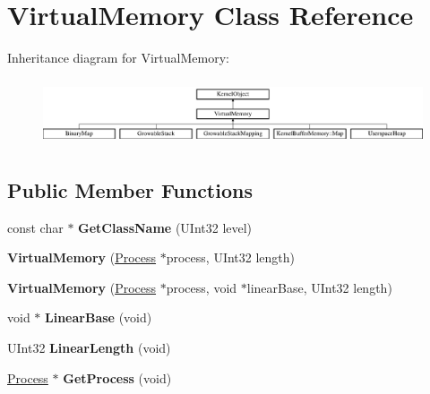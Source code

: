 \hypertarget{class_virtual_memory}{}\section{Virtual\+Memory Class Reference}
\label{class_virtual_memory}
Inheritance diagram for Virtual\+Memory\+:\begin{figure}[H]
\begin{center}
\leavevmode
\includegraphics[height=1.988166cm]{class_virtual_memory}
\end{center}
\end{figure}
\subsection*{Public Member Functions}
\begin{DoxyCompactItemize}
\item 
\mbox{\label{class_virtual_memory_a860d13f7c5653faad6c2d4034fccf4d4}} 
const char $\ast$ {\bfseries Get\+Class\+Name} (U\+Int32 level)
\item 
\mbox{\label{class_virtual_memory_a351ff92ae6d91d9101d30eca193d2c69}} 
{\bfseries Virtual\+Memory} (\hyperlink{class_process}{Process} $\ast$process, U\+Int32 length)
\item 
\mbox{\label{class_virtual_memory_acf40e3c2e4fe27f527cb33b0f2d12a69}} 
{\bfseries Virtual\+Memory} (\hyperlink{class_process}{Process} $\ast$process, void $\ast$linear\+Base, U\+Int32 length)
\item 
\mbox{\label{class_virtual_memory_a346b595b89aae3a73049226586f8fd9b}} 
void $\ast$ {\bfseries Linear\+Base} (void)
\item 
\mbox{\label{class_virtual_memory_a2e2f8252d5f079c7d6648018b0a5c283}} 
U\+Int32 {\bfseries Linear\+Length} (void)
\item 
\mbox{\label{class_virtual_memory_acdcca03b78160abddf9107f08d733261}} 
\hyperlink{class_process}{Process} $\ast$ {\bfseries Get\+Process} (void)
\end{DoxyCompactItemize}
